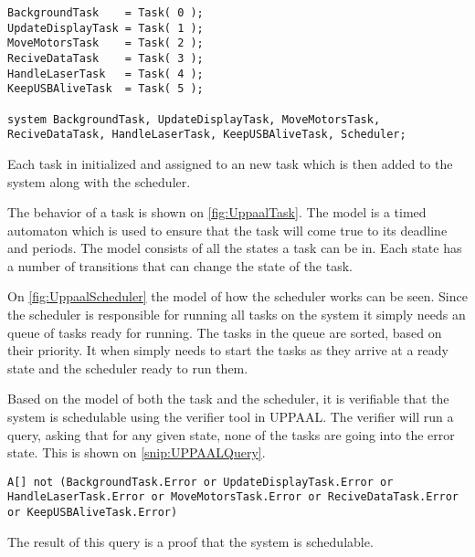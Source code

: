 \begin{lstlisting}[label={snip:UPPAALSystemDeclaration},caption={System declaration from UPPAAL},frame=tlrb,numbers=none]
BackgroundTask    = Task( 0 );
UpdateDisplayTask = Task( 1 );
MoveMotorsTask    = Task( 2 );
ReciveDataTask    = Task( 3 );
HandleLaserTask   = Task( 4 );
KeepUSBAliveTask  = Task( 5 );

system BackgroundTask, UpdateDisplayTask, MoveMotorsTask, ReciveDataTask, HandleLaserTask, KeepUSBAliveTask, Scheduler;
\end{lstlisting}
Each task in initialized and assigned to an new task which is then added to the system along with the scheduler. 

The behavior of a task is shown on \autoref{fig:UppaalTask}.
The model is a timed automaton which is used to ensure that the task will come true to its deadline and periods. 
The model consists of all the states a task can be in.
Each state has a number of transitions that can change the state of the task. 


On \autoref{fig:UppaalScheduler} the model of how the scheduler works can be seen. 
Since the scheduler is responsible for running all tasks on the system it simply needs an queue of tasks ready for running. 
The tasks in the queue are sorted, based on their priority. 
It when simply needs to start the tasks as they arrive at a ready state and the scheduler ready to run them.


Based on the model of both the task and the scheduler, it is verifiable that the system is schedulable using the verifier tool in UPPAAL. 
The verifier will run a query, asking that for any given state, none of the tasks are going into the error state. 
This is shown on \autoref{snip:UPPAALQuery}.
\begin{lstlisting}[label={snip:UPPAALQuery},caption={Query from UPPAAL verifier},frame=tlrb,numbers=none]
A[] not (BackgroundTask.Error or UpdateDisplayTask.Error or HandleLaserTask.Error or MoveMotorsTask.Error or ReciveDataTask.Error or KeepUSBAliveTask.Error)
\end{lstlisting}
The result of this query is a proof that the system is schedulable. 
